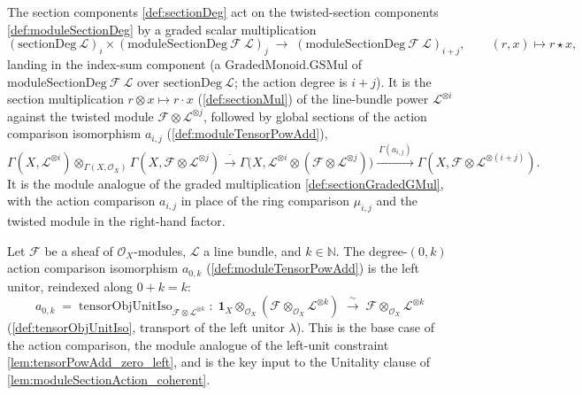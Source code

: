 \begin{definition}
  \label{def:moduleSectionGradedGSMul}
  The section components \cref{def:sectionDeg} act on the twisted-section components
  \cref{def:moduleSectionDeg} by a graded scalar multiplication
  \[
    (\mathrm{sectionDeg}\ \mathcal{L})_i \times
      (\mathrm{moduleSectionDeg}\ \mathcal{F}\ \mathcal{L})_j
    \;\longrightarrow\; (\mathrm{moduleSectionDeg}\ \mathcal{F}\ \mathcal{L})_{i+j},
    \qquad (r, x) \longmapsto r \star x,
  \]
  landing in the index-sum component (a \(\mathrm{GradedMonoid.GSMul}\) of
  \(\mathrm{moduleSectionDeg}\ \mathcal{F}\ \mathcal{L}\) over
  \(\mathrm{sectionDeg}\ \mathcal{L}\); the action degree is \(i+j\)). It is the section multiplication
  \(r \otimes x \mapsto r \cdot x\) (\cref{def:sectionMul}) of the line-bundle power
  \(\mathcal{L}^{\otimes i}\) against the twisted module
  \(\mathcal{F} \otimes \mathcal{L}^{\otimes j}\), followed by global sections of the
  action comparison isomorphism \(a_{i,j}\) (\cref{def:moduleTensorPowAdd}),
  \[
    \Gamma(X, \mathcal{L}^{\otimes i}) \otimes_{\Gamma(X,\mathcal{O}_X)}
      \Gamma(X, \mathcal{F} \otimes \mathcal{L}^{\otimes j})
    \xrightarrow{\ \cdot\ }
    \Gamma\bigl(X, \mathcal{L}^{\otimes i} \otimes
      (\mathcal{F} \otimes \mathcal{L}^{\otimes j})\bigr)
    \xrightarrow{\ \Gamma(a_{i,j})\ }
    \Gamma(X, \mathcal{F} \otimes \mathcal{L}^{\otimes (i+j)}).
  \]
  It is the module analogue of the graded multiplication \cref{def:sectionGradedGMul},
  with the action comparison \(a_{i,j}\) in place of the ring comparison
  \(\mu_{i,j}\) and the twisted module in the right-hand factor.
\end{definition}

\begin{lemma}\leanok
  \label{lem:moduleTensorPowAdd_zero_left}
  Let \(\mathcal{F}\) be a sheaf of \(\mathcal{O}_X\)-modules, \(\mathcal{L}\) a line
  bundle, and \(k \in \mathbb{N}\). The degree-\((0,k)\) action comparison
  isomorphism \(a_{0,k}\) (\cref{def:moduleTensorPowAdd}) is the left unitor,
  reindexed along \(0 + k = k\):
  \[
    a_{0,k} \;=\;
      \mathrm{tensorObjUnitIso}_{\mathcal{F}\otimes\mathcal{L}^{\otimes k}}
      \;:\; \mathbf{1}_X \otimes_{\mathcal{O}_X}
        (\mathcal{F}\otimes_{\mathcal{O}_X}\mathcal{L}^{\otimes k})
      \;\xrightarrow{\ \sim\ }\;
      \mathcal{F}\otimes_{\mathcal{O}_X}\mathcal{L}^{\otimes k}
  \]
  (\cref{def:tensorObjUnitIso}, transport of the left unitor \(\lambda\)). This is
  the base case of the action comparison, the module analogue of the left-unit
  constraint \cref{lem:tensorPowAdd_zero_left}, and is the key input to the
  Unitality clause of \cref{lem:moduleSectionAction_coherent}.
\end{lemma}

